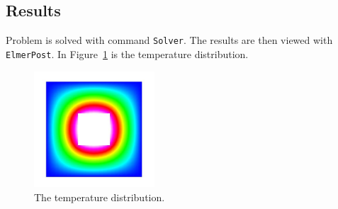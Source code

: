 \subsection*{Results}
Problem is solved with command {\tt Solver}. The results are then viewed with
{\tt ElmerPost}. In Figure~\ref{f:temperature} is the temperature distribution.
\begin{figure}[!hb]
\begin{center}
\includegraphics[width=0.4\textwidth]{temperature}
\end{center}
\caption{The temperature distribution.}
\label{f:temperature}
\end{figure}



















